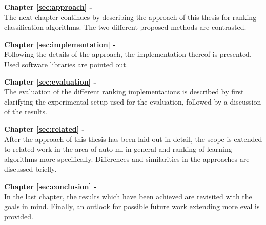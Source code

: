 \textbf{Chapter \ref{sec:approach} - } \\[0.2em]
The next chapter continues by describing the approach of this thesis for ranking classification algorithms. The two different proposed methods are contrasted.

\textbf{Chapter \ref{sec:implementation} - } \\[0.2em]
Following the details of the approach, the implementation thereof is presented. Used software libraries are pointed out.

\textbf{Chapter \ref{sec:evaluation} - } \\[0.2em]
The evaluation of the different ranking implementations is described by first clarifying the experimental setup used for the evaluation, followed by a discussion of the results.

\textbf{Chapter \ref{sec:related} - } \\[0.2em]
After the approach of this thesis has been laid out in detail, the scope is extended to related work in the area of auto-ml in general and ranking of learning algorithms more specifically. Differences and similarities in the approaches are discussed briefly.

\textbf{Chapter \ref{sec:conclusion} - } \\[0.2em]
In the last chapter, the results which have been achieved are revisited with the goals in mind. Finally, an outlook for possible future work extending more eval is provided.

